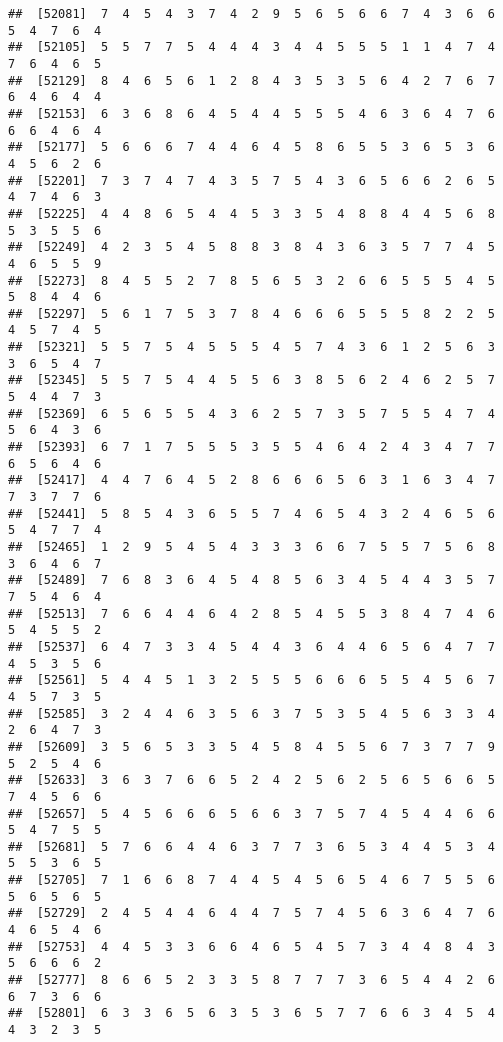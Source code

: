 \documentclass[
]{book}
\begin{document}
\begin{verbatim}
##  [52081]  7  4  5  4  3  7  4  2  9  5  6  5  6  6  7  4  3  6  6  5  4  7  6  4
##  [52105]  5  5  7  7  5  4  4  4  3  4  4  5  5  5  1  1  4  7  4  7  6  4  6  5
##  [52129]  8  4  6  5  6  1  2  8  4  3  5  3  5  6  4  2  7  6  7  6  4  6  4  4
##  [52153]  6  3  6  8  6  4  5  4  4  5  5  5  4  6  3  6  4  7  6  6  6  4  6  4
##  [52177]  5  6  6  6  7  4  4  6  4  5  8  6  5  5  3  6  5  3  6  4  5  6  2  6
##  [52201]  7  3  7  4  7  4  3  5  7  5  4  3  6  5  6  6  2  6  5  4  7  4  6  3
##  [52225]  4  4  8  6  5  4  4  5  3  3  5  4  8  8  4  4  5  6  8  5  3  5  5  6
##  [52249]  4  2  3  5  4  5  8  8  3  8  4  3  6  3  5  7  7  4  5  4  6  5  5  9
##  [52273]  8  4  5  5  2  7  8  5  6  5  3  2  6  6  5  5  5  4  5  5  8  4  4  6
##  [52297]  5  6  1  7  5  3  7  8  4  6  6  6  5  5  5  8  2  2  5  4  5  7  4  5
##  [52321]  5  5  7  5  4  5  5  5  4  5  7  4  3  6  1  2  5  6  3  3  6  5  4  7
##  [52345]  5  5  7  5  4  4  5  5  6  3  8  5  6  2  4  6  2  5  7  5  4  4  7  3
##  [52369]  6  5  6  5  5  4  3  6  2  5  7  3  5  7  5  5  4  7  4  5  6  4  3  6
##  [52393]  6  7  1  7  5  5  5  3  5  5  4  6  4  2  4  3  4  7  7  6  5  6  4  6
##  [52417]  4  4  7  6  4  5  2  8  6  6  6  5  6  3  1  6  3  4  7  7  3  7  7  6
##  [52441]  5  8  5  4  3  6  5  5  7  4  6  5  4  3  2  4  6  5  6  5  4  7  7  4
##  [52465]  1  2  9  5  4  5  4  3  3  3  6  6  7  5  5  7  5  6  8  3  6  4  6  7
##  [52489]  7  6  8  3  6  4  5  4  8  5  6  3  4  5  4  4  3  5  7  7  5  4  6  4
##  [52513]  7  6  6  4  4  6  4  2  8  5  4  5  5  3  8  4  7  4  6  5  4  5  5  2
##  [52537]  6  4  7  3  3  4  5  4  4  3  6  4  4  6  5  6  4  7  7  4  5  3  5  6
##  [52561]  5  4  4  5  1  3  2  5  5  5  6  6  6  5  5  4  5  6  7  4  5  7  3  5
##  [52585]  3  2  4  4  6  3  5  6  3  7  5  3  5  4  5  6  3  3  4  2  6  4  7  3
##  [52609]  3  5  6  5  3  3  5  4  5  8  4  5  5  6  7  3  7  7  9  5  2  5  4  6
##  [52633]  3  6  3  7  6  6  5  2  4  2  5  6  2  5  6  5  6  6  5  7  4  5  6  6
##  [52657]  5  4  5  6  6  6  5  6  6  3  7  5  7  4  5  4  4  6  6  5  4  7  5  5
##  [52681]  5  7  6  6  4  4  6  3  7  7  3  6  5  3  4  4  5  3  4  5  5  3  6  5
##  [52705]  7  1  6  6  8  7  4  4  5  4  5  6  5  4  6  7  5  5  6  5  6  5  6  5
##  [52729]  2  4  5  4  4  6  4  4  7  5  7  4  5  6  3  6  4  7  6  4  6  5  4  6
##  [52753]  4  4  5  3  3  6  6  4  6  5  4  5  7  3  4  4  8  4  3  5  6  6  6  2
##  [52777]  8  6  6  5  2  3  3  5  8  7  7  7  3  6  5  4  4  2  6  6  7  3  6  6
##  [52801]  6  3  3  6  5  6  3  5  3  6  5  7  7  6  6  3  4  5  4  4  3  2  3  5

\end{verbatim}
\end{document}
